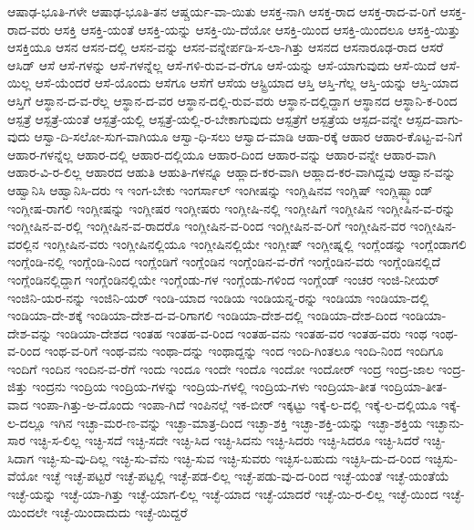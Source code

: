 {ಆಷಾಢ-ಭೂತಿ-ಗಳೇ
ಆಷಾಢ-ಭೂತಿ-ತನ
ಆಷ್ಚರ್ಯ-ವಾ-ಯಿತು
ಆಸಕ್ತ-ನಾಗಿ
ಆಸಕ್ತ-ರಾದ
ಆಸಕ್ತ-ರಾದ-ವ-ರಿಗೆ
ಆಸಕ್ತ-ರಾದ-ವರು
ಆಸಕ್ತಿ
ಆಸಕ್ತಿ-ಯಂತೆ
ಆಸಕ್ತಿ-ಯನ್ನು
ಆಸಕ್ತಿ-ಯಿ-ದೆಯೋ
ಆಸಕ್ತಿ-ಯಿಂದ
ಆಸಕ್ತಿ-ಯಿಂದಲೂ
ಆಸಕ್ತಿ-ಯಿತ್ತು
ಆಸಕ್ತಿಯೂ
ಆಸನ
ಆಸನ-ದಲ್ಲಿ
ಆಸನ-ವನ್ನು
ಆಸನ-ವನ್ನೇರ್ಪಡಿ-ಸ-ಲಾ-ಗಿತ್ತು
ಆಸನದ
ಆಸನಾರೂಢ-ರಾದ
ಆಸರೆ
ಆಸಿಡ್
ಆಸೆ
ಆಸೆ-ಗಳನ್ನು
ಆಸೆ-ಗಳನ್ನೆಲ್ಲ
ಆಸೆ-ಗಳಿ-ರುವ-ವ-ರೆಗೂ
ಆಸೆ-ಯನ್ನು
ಆಸೆ-ಯಾಗುವುದು
ಆಸೆ-ಯಿದೆ
ಆಸೆ-ಯಿಲ್ಲ
ಆಸೆ-ಯೆಂದರೆ
ಆಸೆ-ಯೊಂದು
ಆಸೆಗೂ
ಆಸೆಗೆ
ಆಸೆಯ
ಆಸ್ಟ್ರಿಯಾದ
ಆಸ್ತಿ
ಆಸ್ತಿ-ಗೆಲ್ಲ
ಆಸ್ತಿ-ಯನ್ನು
ಆಸ್ತಿ-ಯಾದ
ಆಸ್ತಿಗೆ
ಆಸ್ಥಾನ-ದ-ವ-ರೆಲ್ಲ
ಆಸ್ಥಾನ-ದ-ವರ
ಆಸ್ಥಾನ-ದಲ್ಲಿ-ರುವ-ವರು
ಆಸ್ಥಾನ-ದಲ್ಲಿದ್ದಾಗ
ಆಸ್ಥಾನದ
ಆಸ್ಥಾನಿ-ಕ-ರಿಂದ
ಆಸ್ಪತ್ರೆ
ಆಸ್ಪತ್ರೆ-ಯಂತೆ
ಆಸ್ಪತ್ರೆ-ಯಲ್ಲಿ
ಆಸ್ಪತ್ರೆ-ಯಲ್ಲಿ-ರ-ಬೇಕಾಗುವುದು
ಆಸ್ಪತ್ರೆಗೆ
ಆಸ್ಪತ್ರೆಯ
ಆಸ್ಪದ-ವನ್ನೇ
ಆಸ್ಪದ-ವಾಗು-ವುದು
ಆಸ್ವಾ-ದಿ-ಸಲೋ-ಸುಗ-ವಾಗಿಯೂ
ಆಸ್ವಾ-ಧಿ-ಸಲು
ಆಸ್ವಾದ-ಮಾಡಿ
ಆಹಾ-ರಕ್ಕೆ
ಆಹಾರ
ಆಹಾರ-ಕೊಟ್ಟ-ವ-ನಿಗೆ
ಆಹಾರ-ಗಳನ್ನೆಲ್ಲ
ಆಹಾರ-ದಲ್ಲಿ
ಆಹಾರ-ದಲ್ಲಿಯೂ
ಆಹಾರ-ದಿಂದ
ಆಹಾರ-ವನ್ನು
ಆಹಾರ-ವನ್ನೇ
ಆಹಾರ-ವಾಗಿ
ಆಹಾರ-ವಿ-ರ-ಲಿಲ್ಲ
ಆಹಾರದ
ಆಹುತಿ
ಆಹುತಿ-ಗಳನ್ನೂ
ಆಹ್ಲಾದ-ಕರ-ವಾಗಿ
ಆಹ್ಲಾದ-ಕರ-ವಾಗಿದ್ದವು
ಆಹ್ವಾನ-ವನ್ನು
ಆಹ್ವಾನಿಸಿ
ಆಹ್ವಾನಿಸಿ-ದರು
ಇ
ಇಂಗ-ಬೇಕು
ಇಂಗರ್ಸಾಲ್
ಇಂಗೀಷನ್ನು
ಇಂಗ್ಲಿಷಿನವ
ಇಂಗ್ಲಿಷ್
ಇಂಗ್ಲಿಷ್ಬ್ಯಾಂಡ್
ಇಂಗ್ಲೀಷ-ರಾಗಲಿ
ಇಂಗ್ಲೀಷನ್ನು
ಇಂಗ್ಲೀಷರ
ಇಂಗ್ಲೀಷರು
ಇಂಗ್ಲೀಷಿ-ನಲ್ಲಿ
ಇಂಗ್ಲೀಷಿಗೆ
ಇಂಗ್ಲೀಷಿನ
ಇಂಗ್ಲೀಷಿನ-ವ-ರನ್ನು
ಇಂಗ್ಲೀಷಿನ-ವ-ರಲ್ಲಿ
ಇಂಗ್ಲೀಷಿನ-ವ-ರಾದರೊ
ಇಂಗ್ಲೀಷಿನ-ವ-ರಿಂದ
ಇಂಗ್ಲೀಷಿನ-ವ-ರಿಗೆ
ಇಂಗ್ಲೀಷಿನ-ವರ
ಇಂಗ್ಲೀಷಿನ-ವರಲ್ಲಿನ
ಇಂಗ್ಲೀಷಿನ-ವರು
ಇಂಗ್ಲೀಷಿನಲ್ಲಿಯೂ
ಇಂಗ್ಲೀಷಿನಲ್ಲಿಯೇ
ಇಂಗ್ಲೀಷ್
ಇಂಗ್ಲೀಷ್ನಲ್ಲಿ
ಇಂಗ್ಲೆಂಡನ್ನು
ಇಂಗ್ಲೆಂಡಾಗಲಿ
ಇಂಗ್ಲೆಂಡಿ-ನಲ್ಲಿ
ಇಂಗ್ಲೆಂಡಿ-ನಿಂದ
ಇಂಗ್ಲೆಂಡಿಗೆ
ಇಂಗ್ಲೆಂಡಿನ
ಇಂಗ್ಲೆಂಡಿನ-ವ-ರೆಗೆ
ಇಂಗ್ಲೆಂಡಿನ-ವರು
ಇಂಗ್ಲೆಂಡಿನಲ್ಲಿದೆ
ಇಂಗ್ಲೆಂಡಿನಲ್ಲಿದ್ದಾಗ
ಇಂಗ್ಲೆಂಡಿನಲ್ಲಿಯೇ
ಇಂಗ್ಲೆಂಡು-ಗಳ
ಇಂಗ್ಲೆಂಡು-ಗಳಿಂದ
ಇಂಗ್ಲೆಂಡ್
ಇಂಚರ
ಇಂಜಿ-ನೀಯರ್
ಇಂಜಿನಿ-ಯರ-ನನ್ನು
ಇಂಜಿನಿ-ಯರ್
ಇಂಡಿ-ಯಾದ
ಇಂಡಿಯ
ಇಂಡಿಯನ್ನ-ರನ್ನು
ಇಂಡಿಯಾ
ಇಂಡಿಯಾ-ದಲ್ಲಿ
ಇಂಡಿಯಾ-ದೇ-ಶಕ್ಕೆ
ಇಂಡಿಯಾ-ದೇಶ-ದ-ವ-ರಿಗಾಗಲಿ
ಇಂಡಿಯಾ-ದೇಶ-ದಲ್ಲಿ
ಇಂಡಿಯಾ-ದೇಶ-ದಿಂದ
ಇಂಡಿಯಾ-ದೇಶ-ವನ್ನು
ಇಂಡಿಯಾ-ದೇಶದ
ಇಂತಹ
ಇಂತಹ-ವ-ರಿಂದ
ಇಂತಹ-ವನು
ಇಂತಹ-ವರ
ಇಂತಹ-ವರು
ಇಂಥ
ಇಂಥ-ವ-ರಿಂದ
ಇಂಥ-ವ-ರಿಗೆ
ಇಂಥ-ವನು
ಇಂಥಾ-ದನ್ನು
ಇಂಥಾದ್ದನ್ನು
ಇಂದ
ಇಂದಿ-ಗಿಂತಲೂ
ಇಂದಿ-ನಿಂದ
ಇಂದಿಗೂ
ಇಂದಿಗೆ
ಇಂದಿನ
ಇಂದಿನ-ವ-ರೆಗೆ
ಇಂದು
ಇಂದೂ
ಇಂದೇ
ಇಂದೊ
ಇಂದೋ
ಇಂದೋರ್
ಇಂದ್ರ
ಇಂದ್ರ-ಜಾಲ
ಇಂದ್ರ-ಜಿತ್ತು
ಇಂದ್ರನು
ಇಂದ್ರಿಯ
ಇಂದ್ರಿಯ-ಗಳನ್ನು
ಇಂದ್ರಿಯ-ಗಳಲ್ಲಿ
ಇಂದ್ರಿಯ-ಗಳು
ಇಂದ್ರಿಯಾ-ತೀತ
ಇಂದ್ರಿಯಾ-ತೀತ-ವಾದ
ಇಂಪಾ-ಗಿತ್ತು-ಅ-ದೊಂದು
ಇಂಪಾ-ಗಿದೆ
ಇಂಪಿನಲ್ಲೆ
ಇಕ-ಬೀರ್
ಇಕ್ಕಟ್ಟು
ಇಕ್ಕೆ-ಲ-ದಲ್ಲಿ
ಇಕ್ಕೆ-ಲ-ದಲ್ಲಿಯೂ
ಇಕ್ಕೆ-ಲ-ದಲ್ಲೂ
ಇಗಿನ
ಇಚ್ಛಾ-ಮರ-ಣ-ವನ್ನು
ಇಚ್ಛಾ-ಮಾತ್ರ-ದಿಂದ
ಇಚ್ಛಾ-ಶಕ್ತಿ
ಇಚ್ಛಾ-ಶಕ್ತಿ-ಯನ್ನು
ಇಚ್ಛಾ-ಶಕ್ತಿಯ
ಇಚ್ಛಾನು-ಸಾರ
ಇಚ್ಛಿ-ಸ-ಲಿಲ್ಲ
ಇಚ್ಛಿ-ಸದೆ
ಇಚ್ಛಿ-ಸದೇ
ಇಚ್ಛಿ-ಸಿದ
ಇಚ್ಛಿ-ಸಿದನು
ಇಚ್ಛಿ-ಸಿದರು
ಇಚ್ಛಿ-ಸಿದರೂ
ಇಚ್ಛಿ-ಸಿದರೆ
ಇಚ್ಛಿ-ಸಿದಾಗ
ಇಚ್ಛಿ-ಸು-ವು-ದಿಲ್ಲ
ಇಚ್ಛಿ-ಸು-ವೆನು
ಇಚ್ಛಿ-ಸುವ
ಇಚ್ಛಿ-ಸುವರು
ಇಚ್ಛಿಸ-ಬಹುದು
ಇಚ್ಛಿಸಿ-ದು-ದ-ರಿಂದ
ಇಚ್ಛಿಸು-ವೆಯೋ
ಇಚ್ಛೆ
ಇಚ್ಛೆ-ಪಟ್ಟರೆ
ಇಚ್ಛೆ-ಪಟ್ಟಲ್ಲಿ
ಇಚ್ಛೆ-ಪಡ-ಲಿಲ್ಲ
ಇಚ್ಛೆ-ಪಡು-ವು-ದ-ರಿಂದ
ಇಚ್ಛೆ-ಯಂತೆ
ಇಚ್ಛೆ-ಯಂತೆಯೆ
ಇಚ್ಛೆ-ಯನ್ನು
ಇಚ್ಛೆ-ಯಾ-ಗಿತ್ತು
ಇಚ್ಛೆ-ಯಾಗ-ಲಿಲ್ಲ
ಇಚ್ಛೆ-ಯಾದ
ಇಚ್ಛೆ-ಯಾದರೆ
ಇಚ್ಛೆ-ಯಿ-ರ-ಲಿಲ್ಲ
ಇಚ್ಛೆ-ಯಿಂದ
ಇಚ್ಛೆ-ಯಿಂದಲೇ
ಇಚ್ಛೆ-ಯಿಂದಾದುದು
ಇಚ್ಛೆ-ಯಿದ್ದರೆ
}
